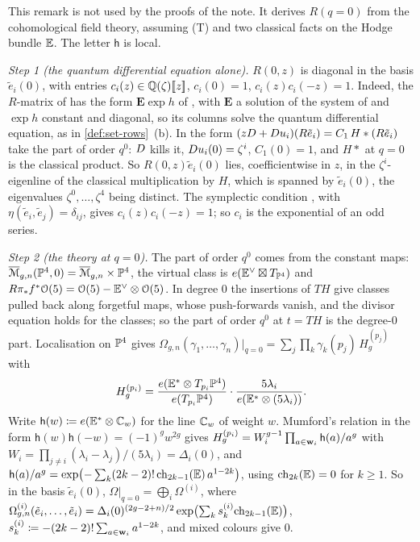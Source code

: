 \begin{rmk}
\label{rmk:set-qrrderiv}
This remark is not used by the proofs of the note. It derives $R(q=0)$ from the cohomological field theory, assuming (T) and two classical facts on the Hodge bundle $\mathbb{E}$. The letter $\mathsf h$ is local.

\emph{Step 1 (the quantum differential equation alone).} $R(0,z)$ is diagonal in the basis $\tilde e_i(0)$, with entries $c_i(z)\in\mathbb{Q}(\zeta)[\![ z ]\!]$, $c_i(0)=1$, $c_i(z)c_i(-z)=1$. Indeed, the $R$-matrix of \cite[Theorem~4.1]{GJR18} has the form $\mathbf E\exp h$ of \cite[8.7~Proposition~(ii)]{MR2917177}, with $\mathbf E$ a solution of the system of \cite[8.2~Proposition~(ii)]{MR2917177} and $\exp h$ constant and diagonal, so its columns solve the quantum differential equation, as in \cref{def:set-rows}~(b). In the form $(zD+D u_i)(R\tilde e_i)=C_1\,H*(R\tilde e_i)$ take the part of order $q^0$: $D$ kills it, $D u_i(0)=\zeta^i$, $C_1(0)=1$, and $H*$ at $q=0$ is the classical product. So $R(0,z)\tilde e_i(0)$ lies, coefficientwise in $z$, in the $\zeta^i$-eigenline of the classical multiplication by $H$, which is spanned by $\tilde e_i(0)$, the eigenvalues $\zeta^0,\dots,\zeta^4$ being distinct. The symplectic condition \cite[(5)]{PPZ15}, with $\eta(\tilde e_i,\tilde e_j)=\delta_{ij}$, gives $c_i(z)c_i(-z)=1$; so $c_i$ is the exponential of an odd series.

\emph{Step 2 (the theory at $q=0$).} The part of order $q^0$ comes from the constant maps: $\overline{\mathcal M}_{g,n}(\mathbb{P}^4,0)=\overline{\mathcal M}_{g,n}\times\mathbb{P}^4$, the virtual class is $e(\mathbb{E}^\vee\boxtimes T_{\mathbb{P}^4})$ and $R\pi_*f^*\mathcal{O}(5)=\mathcal{O}(5)-\mathbb{E}^\vee\otimes\mathcal{O}(5)$. In degree $0$ the insertions of $TH$ give classes pulled back along forgetful maps, whose push-forwards vanish, and the divisor equation holds for the classes; so the part of order $q^0$ at $t=TH$ is the degree-$0$ part. Localisation on $\mathbb{P}^4$ gives $\Omega_{g,n}(\gamma_1,\dots,\gamma_n)|_{q=0}=\sum_j\prod_k\gamma_k(p_j)\,H_g^{(p_j)}$ with \cite[(26)]{LP20}
\[
H_g^{(p_i)}=\frac{e(\mathbb{E}^*\otimes T_{p_i}\mathbb{P}^4)}{e(T_{p_i}\mathbb{P}^4)}\cdot\frac{5\lambda_i}{e(\mathbb{E}^*\otimes(5\lambda_i))}.
\]
Write $\mathsf h(w)\coloneqq e(\mathbb{E}^*\otimes\mathbb{C}_w)$ for the line $\mathbb{C}_w$ of weight $w$. Mumford's relation in the form $\mathsf h(w)\mathsf h(-w)=(-1)^gw^{2g}$ \cite[Section~2.1]{MR1728879} gives $H_g^{(p_i)}=W_i^{g-1}\prod_{a\in\mathbf{w}_i}\mathsf h(a)/a^g$ with $W_i=\prod_{j\neq i}(\lambda_i-\lambda_j)/(5\lambda_i)=\Delta_i(0)$, and $\mathsf h(a)/a^g=\exp\bigl(-\sum_k(2k-2)!\,\mathrm{ch}_{2k-1}(\mathbb{E})\,a^{1-2k}\bigr)$, using $\mathrm{ch}_{2k}(\mathbb{E})=0$ for $k\geq1$. So in the basis $\tilde e_i(0)$, $\Omega|_{q=0}=\bigoplus_i\Omega^{(i)}$, where $\Omega^{(i)}_{g,n}(\tilde e_i,\dots,\tilde e_i)=\Delta_i(0)^{(2g-2+n)/2}\exp\bigl(\sum_ks^{(i)}_k\mathrm{ch}_{2k-1}(\mathbb{E})\bigr)$, $s^{(i)}_k\coloneqq-(2k-2)!\sum_{a\in\mathbf{w}_i}a^{1-2k}$, and mixed colours give $0$.


\end{rmk}
